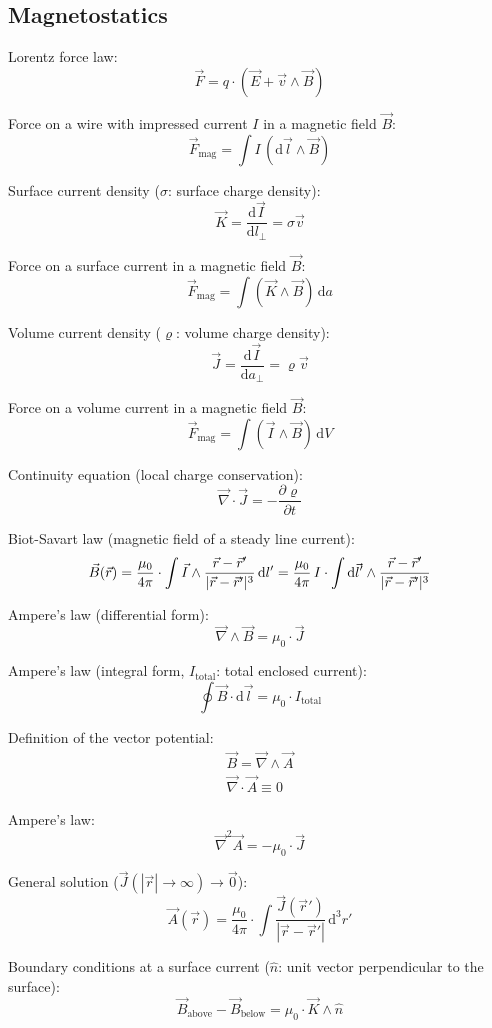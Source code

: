 \documentclass[fontsize=11pt,a4paper]{scrartcl}
\begin{document}
\subsection{Magnetostatics}
Lorentz force law:
\[
	\vec F=q\cdot(\vec E+\vec v\wedge\vec B)
\]

Force on a wire with impressed current $I$ in a magnetic field $\vec B$:
\[
	\vec F_\mathrm{mag}=\int I\,(\mathrm{d}\vec l\wedge\vec B)
\]

Surface current density ($\sigma$: surface charge density):
\[
	\vec K=\frac{\mathrm{d}\vec I}{\mathrm{d}l_\perp}=\sigma\vec v
\]

Force on a surface current in a magnetic field $\vec B$:
\[
	\vec F_\mathrm{mag}=\int(\vec K\wedge\vec B)\,\mathrm{d}a
\]

Volume current density ($\varrho$: volume charge density):
\[
	\vec J=\frac{\mathrm{d}\vec I}{\mathrm{d}a_\perp}=\varrho\vec v
\]

Force on a volume current in a magnetic field $\vec B$:
\[
	\vec F_\mathrm{mag}=\int(\vec I\wedge\vec B)\,\mathrm{d}V
\]

Continuity equation (local charge conservation):
\[
	\vec\nabla\cdot\vec J=-\frac{\partial\varrho}{\partial t}
\]

Biot-Savart law (magnetic field of a steady line current):
\[
	\vec B(\vec r)=\frac{\mu_0}{4\pi}\cdot\int\vec I\wedge\frac{\vec r-\vec r'}{|\vec r-\vec r'|^3}\,\mathrm{d}l'\\
		=\frac{\mu_0}{4\pi}\,I\cdot\int\mathrm{d}\vec l'\wedge\frac{\vec r-\vec r'}{|\vec r-\vec r'|^3}
\]

Ampere's law (differential form):
\[
	\vec\nabla\wedge\vec B=\mu_0\cdot\vec J
\]

Ampere's law (integral form, $I_\mathrm{total}$: total enclosed current):
\[
	\oint\vec B\cdot\mathrm{d}\vec l=\mu_0\cdot I_\mathrm{total}
\]

Definition of the vector potential:
\begin{gather*}
	\vec B=\vec\nabla\wedge\vec A\\
	\vec\nabla\cdot\vec A\equiv 0
\end{gather*}

Ampere's law:
\[
	\vec\nabla^2\vec A=-\mu_0\cdot\vec J
\]

General solution ($\vec J(|\vec r|\to\infty)\to\vec 0$):
\[
	\vec A(\vec r)=\frac{\mu_0}{4\pi}\cdot\int\frac{\vec J(\vec r')}{|\vec r-\vec r'|}\,\mathrm{d}^3 r'
\]

Boundary conditions at a surface current ($\hat n$: unit vector perpendicular to the surface):
\[
	\vec B_\mathrm{above}-\vec B_\mathrm{below}=\mu_0\cdot\vec K\wedge\hat n
\]
\end{document}
